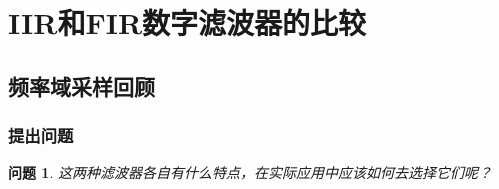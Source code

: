 \documentclass[notheorems,compress,mathserif,table]{beamer}
\newtheorem{wenti}{问题}
\begin{document}
%


%


%


%

\section{IIR和FIR数字滤波器的比较}
\subsection{频率域采样回顾}
\begin{frame}\frametitle{提出问题}%
\begin{wenti}
这两种滤波器各自有什么特点，在实际应用中应该如何去选择它们呢？
\end{wenti}
\end{frame}
\end{document}
